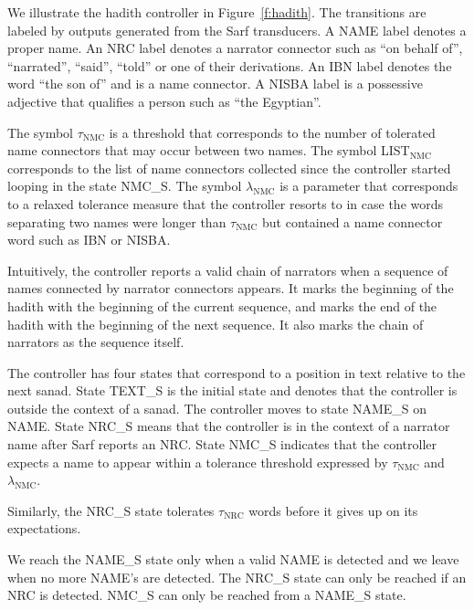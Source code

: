 \documentclass[11pt]{article}
\begin{document}
We illustrate the hadith controller 
in Figure~\ref{f:hadith}. 
The transitions are labeled by outputs generated from 
the Sarf transducers. 
A NAME label denotes a proper name.
An NRC label denotes a narrator connector such as
 ``on behalf of'',  ``narrated'',  ``said'', 
 ``told'' or one of their derivations. 
An IBN label denotes the word  ``the son of'' and is a name connector.
A NISBA label is a possessive adjective that qualifies a person such 
as  ``the Egyptian''. 

The symbol $\tau_{\mbox{NMC}}$ is a threshold
that corresponds to the number of tolerated name connectors 
that may occur between two names. 
The symbol LIST$_{\mbox{NMC}}$ corresponds to the list 
of name connectors collected since the controller
started looping in the state NMC\_S. 
The symbol $\lambda_{\mbox{NMC}}$ is a parameter 
that corresponds to a relaxed tolerance measure that
the controller resorts to in case the words separating
two names were longer than $\tau_{\mbox{NMC}}$ but 
contained a name connector word such as IBN or NISBA.

Intuitively, the controller reports a valid chain 
of narrators when a sequence of names
connected by narrator connectors appears. 
It marks the beginning of the hadith with the beginning of 
the current sequence,
and marks the end of the hadith with the beginning of the 
next sequence. 
It also marks the chain of narrators as the sequence itself. 

The controller has four states that correspond to 
a position in text relative to the next sanad. 
State TEXT\_S is the initial state and denotes that
the controller is outside the context of a sanad.
The controller moves to state NAME\_S on
NAME.
State NRC\_S means that the controller is in the context
of a narrator name after Sarf reports an NRC.
State NMC\_S
indicates that the controller expects a name to appear within 
a tolerance threshold expressed by 
$\tau_{\mbox{NMC}}$ and $\lambda_{\mbox{NMC}}$.


Similarly, the NRC\_S state tolerates $\tau_{\mbox{NRC}}$ words 
before it gives up on its expectations. 

We reach the NAME\_S state only when a
valid NAME is detected and we leave when no more NAME's are detected.
The NRC\_S state can only be reached if an NRC is detected.
NMC\_S can only be reached from a NAME\_S state.

\begin{figure}[tb!]
\end{figure}
\end{document}
